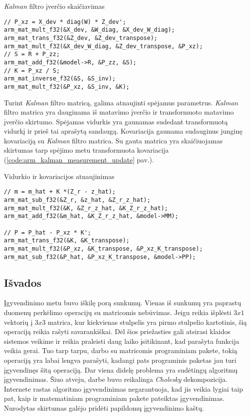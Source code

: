 \begin{cfigure}
    \centering
    \caption{\textit{Kalman} filtro įverčio skaičiavimas}
    \label{code:arm_kalman_gain_calculation}
    \begin{lstlisting}
// P_xz = X_dev * diag(W) * Z_dev';
arm_mat_mult_f32(&X_dev, &W_diag, &X_dev_W_diag);
arm_mat_trans_f32(&Z_dev, &Z_dev_transpose);
arm_mat_mult_f32(&X_dev_W_diag, &Z_dev_transpose, &P_xz);
// S = R + P_zz;
arm_mat_add_f32(&model->R, &P_zz, &S);
// K = P_xz / S;
arm_mat_inverse_f32(&S, &S_inv);
arm_mat_mult_f32(&P_xz, &S_inv, &K);
    \end{lstlisting}
\end{cfigure}

Turint \textit{Kalman} filtro matricą, galima atnaujinti spėjamus parametrus.
\textit{Kalman} filtro matrica yra dauginama iš matavimo įverčio ir transformuoto matavimo įverčio skirtumo.
Spėjamas vidurkis yra gaunamas sudedant transformuotą vidurkį ir prieš tai aprašytą sandaugą.
Kovariacija gaunama sudauginus junginę kovariaciją su \textit{Kalman} filtro matrica.
Su gauta matrica yra skaičiuojamas skirtumas tarp spėjimo metu transformuota kovariacija (\ref{code:arm_kalman_measurement_update} pav.).

\begin{cfigure}
    \centering
    \caption{Vidurkio ir kovariacijos atnaujinimas}
    \label{code:arm_kalman_measurement_update}
    \begin{lstlisting}
// m = m_hat + K *(Z_r - z_hat);
arm_mat_sub_f32(&Z_r, &z_hat, &Z_r_z_hat);
arm_mat_mult_f32(&K, &Z_r_z_hat, &K_Z_r_z_hat);
arm_mat_add_f32(&m_hat, &K_Z_r_z_hat, &model->MM);

// P = P_hat - P_xz * K';
arm_mat_trans_f32(&K, &K_transpose);
arm_mat_mult_f32(&P_xz, &K_transpose, &P_xz_K_transpose);
arm_mat_sub_f32(&P_hat, &P_xz_K_transpose, &model->PP);
    \end{lstlisting}
\end{cfigure}

\subsection{Išvados}

Įgyvendinimo metu buvo iškilę porą sunkumų.
Vienas iš sunkumų yra paprastų duomenų perkėlimo operacijų su matricomis nebūvimas.
Jeigu reikia išplėsti $3x1$ vektorių į $3x3$ matrica, kur kiekvienas stulpelis yra pirmo stulpelio kartotinis, šią operaciją reikia rašyti savarankiškai.
Dėl šios priežasties gali atsirasi klaidos sistemos veikime ir reikia praleisti daug laiko įsitikinant, kad parašyta funkcija veikia gerai.
Tuo tarp tarpu, darbo su matricomis programiniam pakete, tokią operaciją yra labai lengva parašyti, kadangi pats programinis paketas jau turi įgyvendinęs šitą operaciją.
Dar viena didelę problema yra sudėtingų algoritmų įgyvendinimas.
Šiuo atveju, darbe buvo reikalinga \textit{Cholesky} dekompozicija.
Internete rastas algoritmo įgyvendinimas negarantuoja, kad jis veikia lygiai taip pat, kaip ir matematiniam programiniam pakete pateiktas įgyvendinimas.
Nurodytas skirtumas galėjo pridėti papildomų įgyvendinimo kaštų.

